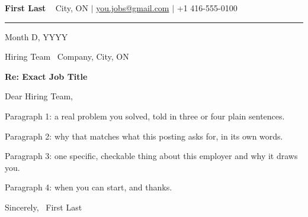\documentclass[letterpaper,11pt]{article}
\begin{document}
\begin{center}
  {\Huge \bfseries First Last} \ \vspace{2pt}
  \small City, ON $|$ \href{mailto:you.jobs@gmail.com}{you.jobs@gmail.com} $|$ +1 416-555-0100
\end{center}
\vspace{4pt}\hrule\vspace{10pt}

Month D, YYYY

Hiring Team \
Company, City, ON

\textbf{Re: Exact Job Title}

Dear Hiring Team,

Paragraph 1: a real problem you solved, told in three or four plain sentences.

Paragraph 2: why that matches what this posting asks for, in its own words.

Paragraph 3: one specific, checkable thing about this employer and why it draws you.

Paragraph 4: when you can start, and thanks.

Sincerely, \
First Last
\end{document}
